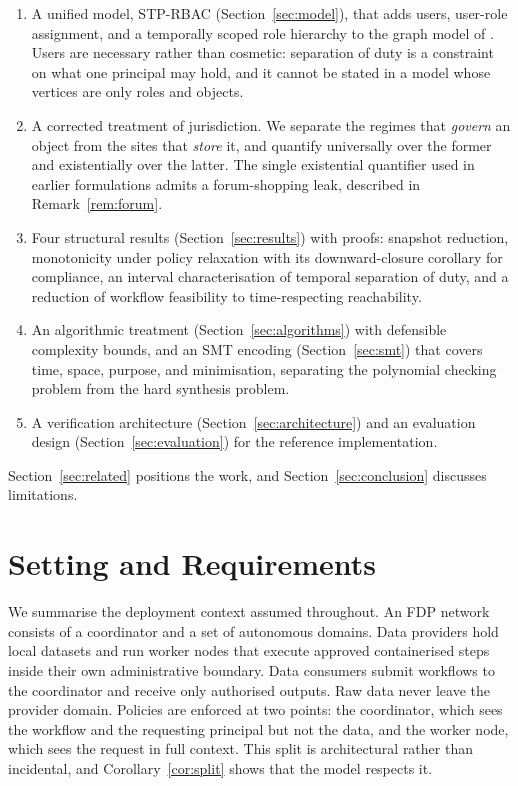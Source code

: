 \documentclass[11pt]{article}
\theoremstyle{definition}
\theoremstyle{plain}
\theoremstyle{remark}
\begin{document}
\begin{enumerate}
  \item A unified model, STP-RBAC (Section~\ref{sec:model}), that adds users,
        user-role assignment, and a temporally scoped role hierarchy to the
        graph model of \citet{kokash2026compliance}. Users are necessary rather
        than cosmetic: separation of duty is a constraint on what one principal
        may hold, and it cannot be stated in a model whose vertices are only
        roles and objects.
  \item A corrected treatment of jurisdiction. We separate the regimes that
        \emph{govern} an object from the sites that \emph{store} it, and
        quantify universally over the former and existentially over the latter.
        The single existential quantifier used in earlier formulations admits a
        forum-shopping leak, described in Remark~\ref{rem:forum}.
  \item Four structural results (Section~\ref{sec:results}) with proofs:
        snapshot reduction, monotonicity under policy relaxation with its
        downward-closure corollary for compliance, an interval characterisation
        of temporal separation of duty, and a reduction of workflow feasibility
        to time-respecting reachability.
  \item An algorithmic treatment (Section~\ref{sec:algorithms}) with defensible
        complexity bounds, and an SMT encoding (Section~\ref{sec:smt}) that
        covers time, space, purpose, and minimisation, separating the
        polynomial checking problem from the hard synthesis problem.
  \item A verification architecture (Section~\ref{sec:architecture}) and an
        evaluation design (Section~\ref{sec:evaluation}) for the reference
        implementation.
\end{enumerate}

Section~\ref{sec:related} positions the work, and Section~\ref{sec:conclusion}
discusses limitations.

\section{Setting and Requirements}
\label{sec:setting}

We summarise the deployment context assumed throughout. An FDP network consists
of a coordinator and a set of autonomous domains. Data providers hold local
datasets and run worker nodes that execute approved containerised steps inside
their own administrative boundary. Data consumers submit workflows to the
coordinator and receive only authorised outputs. Raw data never leave the
provider domain. Policies are enforced at two points: the coordinator, which
sees the workflow and the requesting principal but not the data, and the worker
node, which sees the request in full context. This split is architectural
rather than incidental, and Corollary~\ref{cor:split} shows that the model
respects it.
\end{document}

